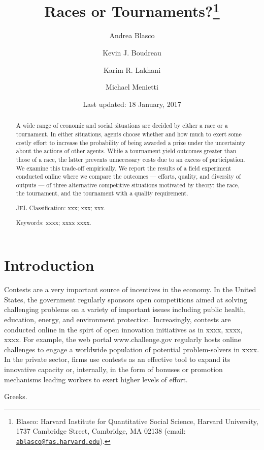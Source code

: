 \documentclass[12pt,]{article}
\title{Races or Tournaments?\thanks{Blasco: Harvard Institute for Quantitative Social Science, Harvard
University, 1737 Cambridge Street, Cambridge, MA 02138 (email:
\href{mailto:ablasco@fas.harvard.edu}{\nolinkurl{ablasco@fas.harvard.edu}}).}}
\author{Andrea Blasco \and Kevin J. Boudreau \and Karim R. Lakhani \and Michael Menietti}
\date{Last updated: 18 January, 2017}
\begin{document}
\maketitle
\begin{abstract}
A wide range of economic and social situations are decided by either a
race or a tournament. In either situations, agents choose whether and
how much to exert some costly effort to increase the probability of
being awarded a prize under the uncertainty about the actions of other
agents. While a tournament yield outcomes greater than those of a race,
the latter prevents unnecessary costs due to an excess of participation.
We examine this trade-off empirically. We report the results of a field
experiment conducted online where we compare the outcomes --- efforts,
quality, and diversity of outputs --- of three alternative competitive
situations motivated by theory: the race, the tournament, and the
tournament with a quality requirement.

\smallskip\noindent 
JEL Classification: xxx; xxx; xxx.

\smallskip\noindent 
Keywords: xxxx; xxxx xxxx.
\end{abstract}


\clearpage
\tableofcontents
\setcounter{tocdepth}{2}
\clearpage

\section{Introduction}\label{introduction}

Contests are a very important source of incentives in the economy. In
the United States, the government regularly sponsors open competitions
aimed at solving challenging problems on a variety of important issues
including public health, education, energy, and environment protection.
Increasingly, contests are conducted online in the spirt of open
innovation initiatives as in xxxx, xxxx, xxxx. For example, the web
portal www.challenge.gov regularly hosts online challenges to engage a
worldwide population of potential problem-solvers in xxxx. In the
private sector, firms use contests as an effective tool to expand its
innovative capacity or, internally, in the form of bonuses or promotion
mechanisms leading workers to exert higher levels of effort.

Greeks.
\end{document}
